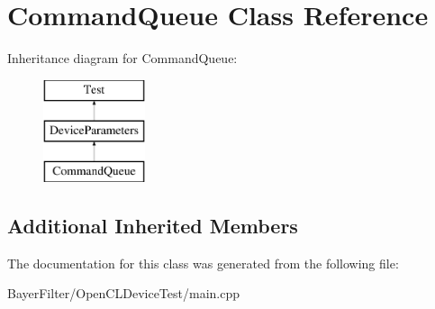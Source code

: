 \hypertarget{class_command_queue}{\section{Command\-Queue Class Reference}
\label{class_command_queue}
}
Inheritance diagram for Command\-Queue\-:\begin{figure}[H]
\begin{center}
\leavevmode
\includegraphics[height=3.000000cm]{class_command_queue}
\end{center}
\end{figure}
\subsection*{Additional Inherited Members}


The documentation for this class was generated from the following file\-:\begin{DoxyCompactItemize}
\item 
Bayer\-Filter/\-Open\-C\-L\-Device\-Test/main.\-cpp\end{DoxyCompactItemize}
